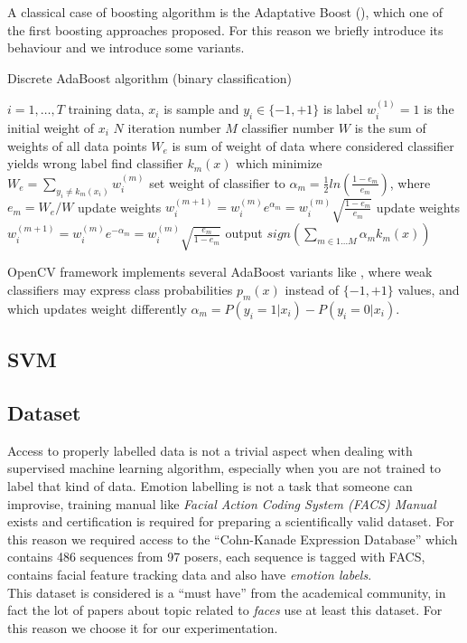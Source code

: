 A classical case of boosting algorithm is the Adaptative Boost ()\cite{Friedman98additivelogistic}, which one of the first boosting approaches proposed. For this reason we briefly introduce its behaviour and we introduce some variants.

\begin{algorithm}
\caption{Discrete AdaBoost algorithm (binary classification)} 
\label{alg:adaboost}
\begin{algorithmic}
\STATE $i=1,\ldots,T$ training data, $x_i$ is sample and $y_i \in \{-1,+1\}$ is label
\STATE $w_{i}^{(1)}=1$ is the initial weight of $x_i$
\STATE $N$ iteration number
\STATE $M$ classifier number
\STATE $W$ is the sum of weights of all data points
\STATE $W_e$ is sum of weight of data where considered classifier yields wrong label
		\STATE find classifier $k_{m}(x)$ which minimize $W_e=\sum_{y_i \neq k_m(x_i)}{w_{i}^{(m)}}$
		\STATE set weight of classifier to $\alpha_{m}=\frac{1}{2}ln(\frac{1-e_m}{e_m}) $, where $e_m=W_e/W$
	 		\STATE update weights $w_{i}^{(m+1)}=w_{i}^{(m)}e^{\alpha_m}=w_{i}^{(m)}\sqrt{\frac{1-e_m}{e_m}}$
		\ELSE
			\STATE update weights $w_{i}^{(m+1)}=w_{i}^{(m)}e^{-\alpha_m}=w_{i}^{(m)}\sqrt{\frac{e_m}{1-e_m}}$
 		\ENDIF
\STATE output $sign( \sum_{m \in 1 \ldots M}{ \alpha_m k_m (x)} )$
\ENDFOR
\end{algorithmic}
\end{algorithm}

OpenCV framework implements several AdaBoost variants like , where weak classifiers may express class probabilities $p_m(x)$ instead of $\{-1,+1\}$ values, and  which updates weight differently $\alpha_{m}=P(y_i=1|x_i)-P(y_i=0|x_i)$. 


\subsection{SVM}


\subsection{Dataset}

Access to properly labelled data is not a trivial aspect when dealing with supervised machine learning algorithm, especially when you are not trained to label that kind of data. Emotion labelling is not a task that someone can improvise, training manual like \emph{Facial Action Coding System (FACS) Manual} exists and certification is required for preparing a scientifically valid dataset. For this reason we required access to the ``Cohn-Kanade Expression Database''\cite{Kanade2000} which contains 486 sequences from 97 posers, each sequence is tagged with FACS, contains facial feature tracking data and also have \emph{emotion labels}. \\

This dataset is considered is a ``must have'' from the academical community, in fact the lot of papers about topic related to \emph{faces} use at least this dataset. For this reason we choose it for our experimentation. 


